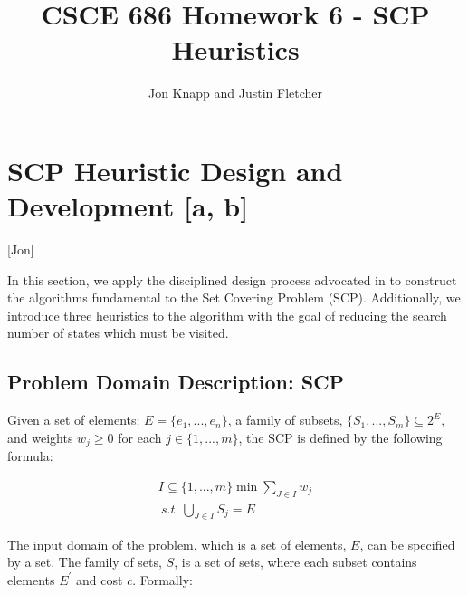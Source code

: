 \documentclass[12pt]{article}
\begin{document}
\title{CSCE 686 Homework 6 - SCP Heuristics}
\author{Jon Knapp and Justin Fletcher}
\maketitle

\section{SCP Heuristic Design and Development [a, b]} \label{scn:design}

[Jon]

In this section, we apply the disciplined design process advocated in \cite{ClassNotes686} to construct the algorithms fundamental to the Set Covering Problem (SCP). Additionally, we introduce three heuristics to the algorithm with the goal of reducing the search number of states which must be visited.

\subsection{Problem Domain Description: SCP}
Given a set of elements: $E=\{e_1,...,e_n\}$, a family of subsets, $\{S_1,...,S_m\}\subseteq 2^E$, and weights $w_j \geq 0$ for each $j\in\{1,...,m\}$, the SCP is defined by the following formula:

\begin{align*}
I \subseteq \{1,...,m\} \min \sum_{J \in I} w_j \\
\:s.t.\: \bigcup_{J \in I} S_j = E
\end{align*}


The input domain of the problem, which is a set of elements, $E$, can be specified by a set. The family of sets, $S$, is a set of sets, where each subset contains elements $E^\prime$ and cost $c$. Formally:
\end{document}
